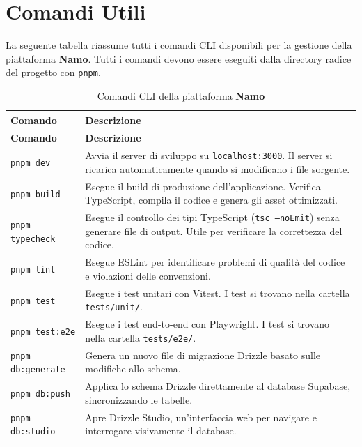 \documentclass[a4paper,11pt,oneside]{book}
\newcommand{\namo}{\textbf{Namo}}
\begin{document}
\section{Comandi Utili}
\label{sec:comandi-utili}

La seguente tabella riassume tutti i comandi CLI disponibili per la gestione della piattaforma \namo{}. Tutti i comandi devono essere eseguiti dalla directory radice del progetto con \texttt{pnpm}.

\begin{longtable}{l p{8cm}}
\caption{Comandi CLI della piattaforma \namo{}} \label{tab:comandi-cli} \\
\toprule
\textbf{Comando} & \textbf{Descrizione} \\
\midrule
\endfirsthead
\toprule
\textbf{Comando} & \textbf{Descrizione} \\
\midrule
\endhead
\texttt{pnpm dev}         & Avvia il server di sviluppo su \texttt{localhost:3000}. Il server si ricarica automaticamente quando si modificano i file sorgente. \\[4pt]
\texttt{pnpm build}       & Esegue il build di produzione dell'applicazione. Verifica TypeScript, compila il codice e genera gli asset ottimizzati. \\[4pt]
\texttt{pnpm typecheck}   & Esegue il controllo dei tipi TypeScript (\texttt{tsc --noEmit}) senza generare file di output. Utile per verificare la correttezza del codice. \\[4pt]
\texttt{pnpm lint}         & Esegue ESLint per identificare problemi di qualit\`a del codice e violazioni delle convenzioni. \\[4pt]
\texttt{pnpm test}         & Esegue i test unitari con Vitest. I test si trovano nella cartella \texttt{tests/unit/}. \\[4pt]
\texttt{pnpm test:e2e}     & Esegue i test end-to-end con Playwright. I test si trovano nella cartella \texttt{tests/e2e/}. \\[4pt]
\texttt{pnpm db:generate}  & Genera un nuovo file di migrazione Drizzle basato sulle modifiche allo schema. \\[4pt]
\texttt{pnpm db:push}      & Applica lo schema Drizzle direttamente al database Supabase, sincronizzando le tabelle. \\[4pt]
\texttt{pnpm db:studio}    & Apre Drizzle Studio, un'interfaccia web per navigare e interrogare visivamente il database. \\
\bottomrule
\end{longtable}
\end{document}
